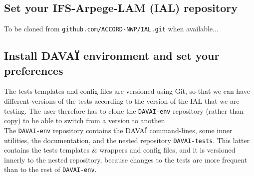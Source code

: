 \documentclass[a4paper,10pt,twoside]{article}
\begin{document}
\subsection{Set your IFS-Arpege-LAM (IAL) repository}
To be cloned from \texttt{github.com/ACCORD-NWP/IAL.git} when available...



\subsection{Install DAVAÏ environment and set your preferences \label{sect:davai_install}}

The tests templates and config files are versioned using Git, so that we can have different versions of the tests according to the version of the IAL that we are testing. The user therefore has to clone the \texttt{DAVAI-env} repository (rather than copy) to be able to switch from a version to another.\\

The \texttt{DAVAI-env} repository contains the DAVAÏ command-lines, some inner utilities, the documentation, and the nested repository \texttt{DAVAI-tests}. This latter contains the tests templates \& wrappers and config files, and it is versioned innerly to the nested repository, because changes to the tests are more frequent than to the rest of \texttt{DAVAI-env}.\\
\end{document}
